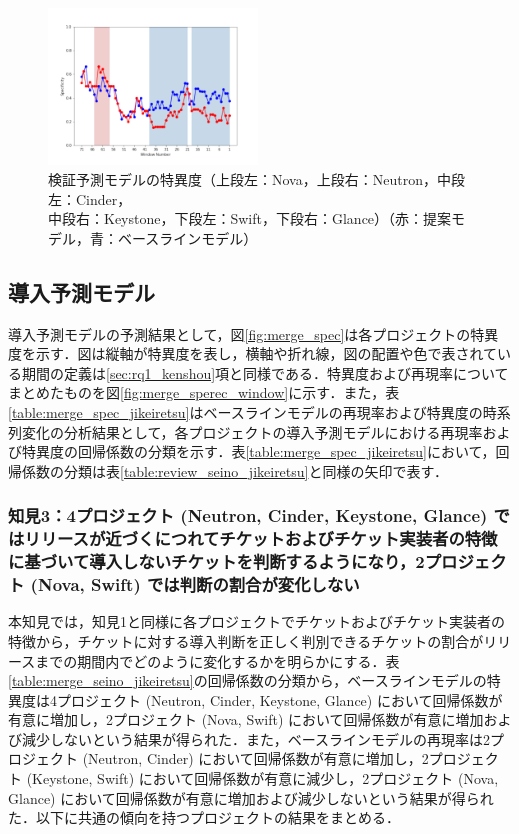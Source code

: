 \documentclass[11pt]{jreport}
\begin{document}
\begin{figure}[H]
\begin{center}
    \includegraphics[width=0.495\textwidth]{Uenaka_fig/RQ2_result/Glance_review_Specificity.pdf}
    \caption{検証予測モデルの特異度（上段左：Nova，上段右：Neutron，中段左：Cinder，\\ 中段右：Keystone，下段左：Swift，下段右：Glance）（赤：提案モデル，青：ベースラインモデル）}
    \label{fig:review_spec}
\end{center}
\end{figure}


\subsection{導入予測モデル}
導入予測モデルの予測結果として，図\ref{fig:merge_spec}は各プロジェクトの特異度を示す．図は縦軸が特異度を表し，横軸や折れ線，図の配置や色で表されている期間の定義は\ref{sec:rq1_kenshou}項と同様である．特異度および再現率についてまとめたものを図\ref{fig:merge_sperec_window}に示す．また，表\ref{table:merge_spec_jikeiretsu}はベースラインモデルの再現率および特異度の時系列変化の分析結果として，各プロジェクトの導入予測モデルにおける再現率および特異度の回帰係数の分類を示す．表\ref{table:merge_spec_jikeiretsu}において，回帰係数の分類は表\ref{table:review_seino_jikeiretsu}と同様の矢印で表す．

\subsubsection{知見3：4プロジェクト (Neutron, Cinder, Keystone, Glance) ではリリースが近づくにつれてチケットおよびチケット実装者の特徴に基づいて導入しないチケットを判断するようになり，2プロジェクト (Nova, Swift) では判断の割合が変化しない}
本知見では，知見1と同様に各プロジェクトでチケットおよびチケット実装者の特徴から，チケットに対する導入判断を正しく判別できるチケットの割合がリリースまでの期間内でどのように変化するかを明らかにする．表\ref{table:merge_seino_jikeiretsu}の回帰係数の分類から，ベースラインモデルの特異度は4プロジェクト (Neutron, Cinder, Keystone, Glance) において回帰係数が有意に増加し，2プロジェクト (Nova, Swift) において回帰係数が有意に増加および減少しないという結果が得られた．また，ベースラインモデルの再現率は2プロジェクト (Neutron, Cinder) において回帰係数が有意に増加し，2プロジェクト (Keystone, Swift) において回帰係数が有意に減少し，2プロジェクト (Nova, Glance) において回帰係数が有意に増加および減少しないという結果が得られた．以下に共通の傾向を持つプロジェクトの結果をまとめる．
\end{document}
